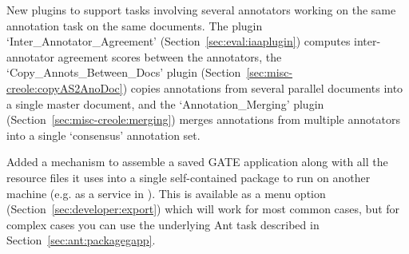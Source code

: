 
New plugins to support tasks involving several annotators working on the same
annotation task on the same documents.  The plugin
`Inter\_Annotator\_Agreement' (Section~\ref{sec:eval:iaaplugin}) computes
inter-annotator agreement scores between the annotators, the
`Copy\_Annots\_Between\_Docs' plugin
(Section~\ref{sec:misc-creole:copyAS2AnoDoc}) copies annotations from several parallel documents into a single master document,
and the `Annotation\_Merging' plugin (Section~\ref{sec:misc-creole:merging})
merges annotations from multiple annotators into a single `consensus'
annotation set.


Added a mechanism to assemble a saved GATE application along with all the
resource files it uses into a single self-contained package to run on another
machine (e.g. as a service in ).  This is available as a menu option
(Section~\ref{sec:developer:export}) which will work for most common cases, but for
complex cases you can use the underlying Ant task described in
Section~\ref{sec:ant:packagegapp}.


